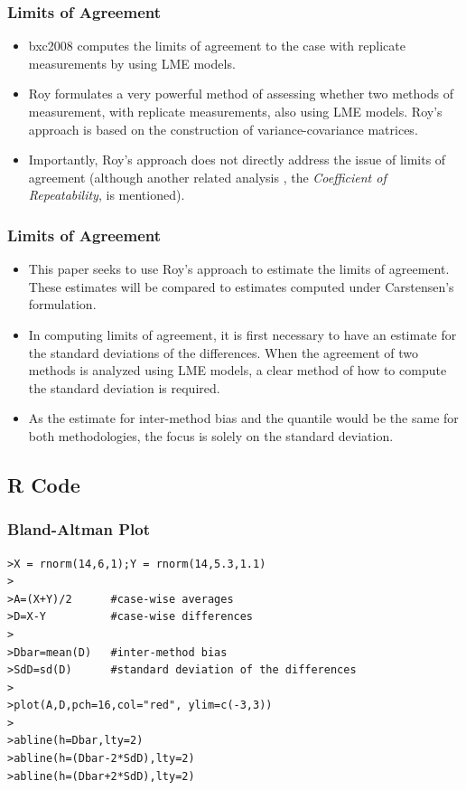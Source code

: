 \documentclass[compress]{beamer}        %
\begin{document}
\begin{frame}
\frametitle{Limits of Agreement}
\begin{itemize}
\item \alert{bxc2008}  computes the limits of agreement to the case with replicate measurements by using LME models.
\item \alert{Roy} formulates a very powerful method of assessing whether two methods of measurement, with replicate measurements, also using LME models. Roy's approach is based on the construction of variance-covariance matrices.
\item Importantly, Roy's approach does not directly address the issue of limits of agreement (although another related analysis , the \emph{Coefficient of Repeatability}, is mentioned).
\end{itemize}
\end{frame}
\begin{frame}
\frametitle{Limits of Agreement}
\begin{itemize}
\item This paper seeks to use Roy's approach to estimate the limits of agreement. These estimates will be compared to estimates computed under Carstensen's formulation.

\item In computing limits of agreement, it is first necessary to have an estimate for the standard deviations of the differences. When the agreement of two methods is analyzed using LME models, a clear method of how to compute the standard deviation is required. 
\item As the estimate for inter-method bias and the quantile would be the same for both methodologies, the focus is solely on the standard deviation.
\end{itemize}
\end{frame}
\subsection*{R Code}
\begin{frame}[fragile]
\frametitle{Bland-Altman Plot}
\begin{verbatim}
>X = rnorm(14,6,1);Y = rnorm(14,5.3,1.1)
>
>A=(X+Y)/2		#case-wise averages
>D=X-Y			#case-wise differences
>		
>Dbar=mean(D)	#inter-method bias
>SdD=sd(D)		#standard deviation of the differences
>
>plot(A,D,pch=16,col="red", ylim=c(-3,3))
>
>abline(h=Dbar,lty=2)
>abline(h=(Dbar-2*SdD),lty=2)
>abline(h=(Dbar+2*SdD),lty=2)
\end{verbatim}
\end{frame}
\end{document}
